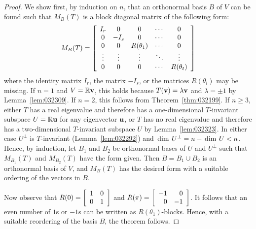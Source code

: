 \begin{proof}
We show first, by induction on $n$, that an orthonormal basis $B$ of $V$ can be found such that $M_{B}(T)$ is a block diagonal matrix of the following form:
\begin{equation*}
M_B(T) = 
\left[ \begin{array}{ccccc}
I_r & 0 & 0			& \cdots & 0 \\
0 & -I_s & 0 			& \cdots & 0 \\
0 & 0 & R(\theta_1) & \cdots & 0 \\
\vdots & \vdots & \vdots & \ddots & \vdots \\
0 & 0 & 0 			& \cdots & R(\theta_t)
\end{array} \right]
\end{equation*}
where the identity matrix $I_{r}$, the matrix $-I_{s}$, or the matrices $R(\theta_{i})$ may be missing. If $n = 1$ and $V = \mathbb{R}\textbf{v}$, this holds because $T(\textbf{v}) = \lambda\textbf{v}$ and
$\lambda = \pm 1$ by Lemma~\ref{lem:032309}. If $n = 2$, this follows from Theorem~\ref{thm:032199}. If $n \geq 3$, either $T$ has a real eigenvalue and therefore has a one-dimensional $T$-invariant subspace $U = \mathbb{R}\textbf{u}$ for any eigenvector $\textbf{u}$, or $T$ has no real eigenvalue and therefore has a two-dimensional $T$-invariant subspace $U$ by Lemma~\ref{lem:032323}. In either case $U^{\perp}$ is $T$-invariant (Lemma~\ref{lem:032292}) and $\thinspace\operatorname{dim\medspace} U^{\perp} = n - \thinspace\operatorname{dim\medspace} U < n$. Hence, by induction, let $B_{1}$ and $B_{2}$ be orthonormal bases of $U$ and $U^{\perp}$ such that $M_{B_1}(T)$ and $M_{B_2}(T)$ have the form given. Then $B = B_{1} \cup B_{2}$ is an orthonormal basis of $V$, and $M_{B}(T)$ has the desired form with a suitable ordering of the vectors in $B$.

\noindent Now observe that $R(0) = 
\left[ \begin{array}{rr}
1 & 0 \\
0 & 1
\end{array} \right]$ and $R(\pi) = 
\left[ \begin{array}{rr}
-1 & 0 \\
0 & -1
\end{array} \right]$. It follows that an even number of $1$s or $-1$s can be written as $R(\theta_{1})$-blocks. Hence, with a suitable reordering of the basis $B$, the theorem follows.
\end{proof}

